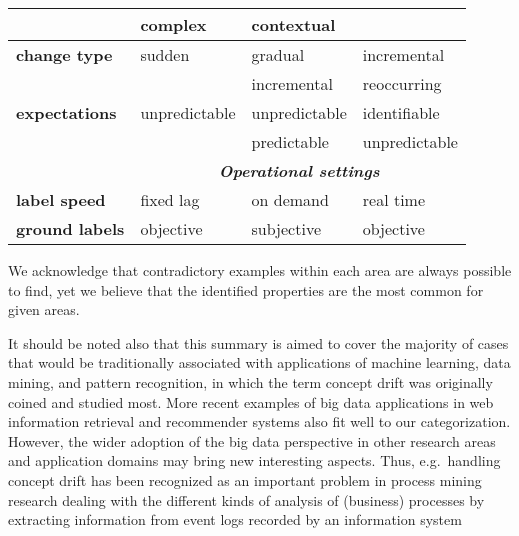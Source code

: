 \documentclass{llncs}
\begin{document}
\begin{table}[htb]
{\begin{tabular}{|p{2.5cm}|p{3cm} p{3cm} p{3cm}|}
            &   complex            & contextual                    &         \\ %
            \hline
\textbf{change type} & sudden        & gradual               & incremental     \\ %
            &               & incremental           & reoccurring          \\ %
            \hline
\textbf{expectations}& unpredictable & unpredictable         & identifiable   \\ %
            &               & predictable           & unpredictable         \\ %
\hline
&\multicolumn{3}{c|}{\emph{\textbf{Operational settings}}} \\
\hline
\textbf{label speed} & fixed lag     & on demand             & real time     \\ %
\textbf{ground labels}& objective         & subjective                  & objective            \\%
\hline
\end{tabular}
}
\label{tab:properties}
\end{table}

We acknowledge that contradictory examples within each area are always possible to find, yet we believe that the identified properties are the most common for given areas.

It should be noted also that this summary is aimed to cover the majority of cases that would be traditionally associated with applications of machine learning, data mining, and pattern recognition, in which the term concept drift was originally coined and studied most. More recent examples of big data applications in web information retrieval and recommender systems also fit well to our categorization.
However, the wider adoption of the big data perspective in other research areas and application domains may bring new interesting aspects. Thus, e.g.\ handling concept drift has been recognized as an important problem in process mining research dealing with the different kinds of analysis of (business) processes by extracting information from event logs recorded by an information system~\cite{DBLP:conf/ida/CarmonaG12,BoseAZP13}
\end{document}
